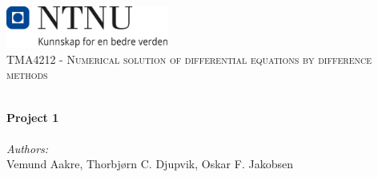 
\begin{titlepage}
\vbox{ }
\vbox{ }
\begin{center}
\includegraphics[width=0.40\textwidth]{Images/NTNU_logo.png}\\[1cm]
\textsc{\Large TMA4212 - Numerical solution of differential equations by difference methods}\\[0.5cm]
\vbox{ }

\HRule \\[0.4cm]
{ \huge \bfseries Project 1}\\[0.4cm]
\HRule \\[1.5cm]

\large
\emph{Authors:}\\
Vemund Aakre, Thorbjørn C. Djupvik, Oskar F. Jakobsen
\vfill

\end{center}
\end{titlepage}